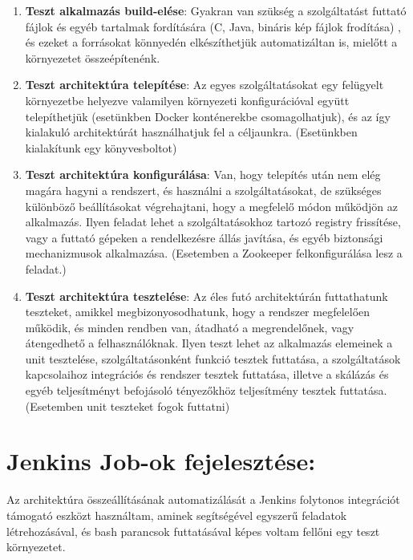 \documentclass[11pt,magyar,a4paper,oneside,]{report}
\providecommand{\tightlist}{%
  \setlength{\itemsep}{0pt}\setlength{\parskip}{0pt}}
\begin{document}
\begin{enumerate}
\def\labelenumi{\arabic{enumi}.}
\tightlist
\item
  \textbf{Teszt alkalmazás build-elése}: Gyakran van szükség a
  szolgáltatást futtató fájlok és egyéb tartalmak fordítására (C, Java,
  bináris kép fájlok frodítása) , és ezeket a forrásokat könnyedén
  elkészíthetjük automatizáltan is, mielőtt a környezetet
  összeépítenénk.
\item
  \textbf{Teszt architektúra telepítése}: Az egyes szolgáltatásokat egy
  felügyelt környezetbe helyezve valamilyen környezeti konfigurációval
  együtt telepíthetjük (esetünkben Docker konténerekbe csomagolhatjuk),
  és az így kialakuló architektúrát használhatjuk fel a céljaunkra.
  (Esetünkben kialakítunk egy könyvesboltot)
\item
  \textbf{Teszt architektúra konfigurálása}: Van, hogy telepítés után
  nem elég magára hagyni a rendszert, és használni a szolgáltatásokat,
  de szükséges különböző beállításokat végrehajtani, hogy a megfelelő
  módon működjön az alkalmazás. Ilyen feladat lehet a szolgáltatásokhoz
  tartozó registry frissítése, vagy a futtató gépeken a rendelkezésre
  állás javítása, és egyéb biztonsági mechanizmusok alkalmazása.
  (Esetemben a Zookeeper felkonfigurálása lesz a feladat.)
\item
  \textbf{Teszt architektúra tesztelése}: Az éles futó architektúrán
  futtathatunk teszteket, amikkel megbizonyosodhatunk, hogy a rendszer
  megfelelően működik, és minden rendben van, átadható a megrendelőnek,
  vagy átengedhető a felhasználóknak. Ilyen teszt lehet az alkalmazás
  elemeinek a unit tesztelése, szolgáltatásonként funkció tesztek
  futtatása, a szolgáltatások kapcsolaihoz integrációs és rendszer
  tesztek futtatása, illetve a skálázás és egyéb teljesítményt
  befojásoló tényezőkhöz teljesítmény tesztek futtatása. (Esetemben unit
  teszteket fogok futtatni)
\end{enumerate}

\section{Jenkins Job-ok
fejelesztése:}\label{jenkins-job-ok-fejelesztuxe9se}

Az architektúra összeállításának automatizálását a Jenkins folytonos
integrációt támogató eszközt használtam, aminek segítségével egyszerű
feladatok létrehozásával, és bash parancsok futtatásával képes voltam
fellőni egy teszt környezetet.
\end{document}
